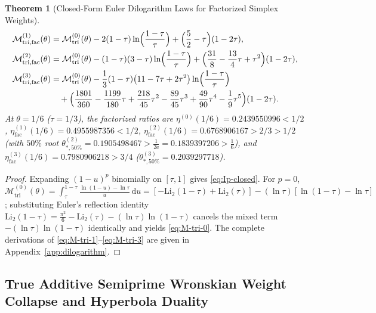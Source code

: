 \documentclass[11pt,reqno]{amsart}
\newtheorem{theorem}{Theorem}[section]
\theoremstyle{definition}
\theoremstyle{remark}
\numberwithin{equation}{section}
\newcommand{\dd}{\mathrm{d}}
\newcommand{\ee}{\mathrm{e}}
\newcommand{\Li}{\mathrm{Li}}
\newcommand{\tri}{\mathrm{tri}}
\newcommand{\facw}{\mathrm{fac}}
\begin{document}
\begin{theorem}[Closed-Form Euler Dilogarithm Laws for Factorized Simplex Weights]
\begin{align}
\mathcal{M}_{\tri,\facw}^{(1)}(\theta) &= \mathcal{M}_{\tri}^{(0)}(\theta) - 2(1-\tau)\ln\Bigl(\frac{1-\tau}{\tau}\Bigr) + \Bigl(\frac{5}{2} - \tau\Bigr)(1-2\tau), \label{eq:M-tri-1} \\
\mathcal{M}_{\tri,\facw}^{(2)}(\theta) &= \mathcal{M}_{\tri}^{(0)}(\theta) - (1-\tau)(3-\tau)\ln\Bigl(\frac{1-\tau}{\tau}\Bigr) + \Bigl(\frac{31}{8} - \frac{13}{4}\tau + \tau^2\Bigr)(1-2\tau), \label{eq:M-tri-2} \\
\mathcal{M}_{\tri,\facw}^{(3)}(\theta) &= \mathcal{M}_{\tri}^{(0)}(\theta) - \frac{1}{3}(1-\tau)\bigl(11 - 7\tau + 2\tau^2\bigr)\ln\Bigl(\frac{1-\tau}{\tau}\Bigr) \nonumber\\
&\quad + \Bigl(\frac{1801}{360} - \frac{1199}{180}\tau + \frac{218}{45}\tau^2 - \frac{89}{45}\tau^3 + \frac{49}{90}\tau^4 - \frac{1}{9}\tau^5\Bigr)(1-2\tau). \label{eq:M-tri-3}
\end{align}
At $\theta = 1/6$ ($\tau = 1/3$), the factorized ratios are $\eta^{(0)}(1/6) = 0.2439550996 < 1/2$, $\eta_{\facw}^{(1)}(1/6) = 0.4955987356 < 1/2$, $\eta_{\facw}^{(2)}(1/6) = 0.6768906167 > 2/3 > 1/2$ (with $50\%$ root $\theta_{*,50\%}^{(2)} = 0.1905498467 > \frac{1}{2\ee} = 0.1839397206 > \frac{1}{6}$), and $\eta_{\facw}^{(3)}(1/6) = 0.7980906218 > 3/4$ ($\theta_{*,50\%}^{(3)} = 0.2039297718$).
\end{theorem}

\begin{proof}
Expanding $(1-u)^p$ binomially on $[\tau,1]$ gives \eqref{eq:Ip-closed}. For $p=0$, $\mathcal{M}_{\tri}^{(0)}(\theta) = \int_\tau^{1-\tau} \frac{\ln(1-u) - \ln\tau}{u}\,\dd u = [-\Li_2(1-\tau) + \Li_2(\tau)] - (\ln\tau)[\ln(1-\tau) - \ln\tau]$; substituting Euler's reflection identity $\Li_2(1-\tau) = \frac{\pi^2}{6} - \Li_2(\tau) - (\ln\tau)\ln(1-\tau)$ \cite{Lewin1981} cancels the mixed term $-(\ln\tau)\ln(1-\tau)$ identically and yields \eqref{eq:M-tri-0}. The complete derivations of \eqref{eq:M-tri-1}--\eqref{eq:M-tri-3} are given in Appendix~\ref{app:dilogarithm}.
\end{proof}

\subsection{True Additive Semiprime Wronskian Weight Collapse and Hyperbola Duality}\label{subsec:additive-and-duality}
\end{document}
